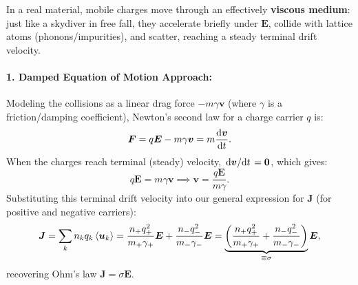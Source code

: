 \begin{center}
\end{center}

In a real material, mobile charges move through an effectively \textbf{viscous medium}: just like a skydiver in free fall, they accelerate briefly under $\bm{E}$, collide with lattice atoms (phonons/impurities), and scatter, reaching a steady terminal drift velocity.

\paragraph{1. Damped Equation of Motion Approach:}
Modeling the collisions as a linear drag force $-m\gamma \bm{v}$ (where $\gamma$ is a friction/damping coefficient), Newton's second law for a charge carrier $q$ is:
\begin{equation}
    \bm{F} = q\bm{E} - m\gamma \bm{v} = m\dv{\bm{v}}{t}.
\end{equation}
When the charges reach terminal (steady) velocity, $\dv*{\bm{v}}{t} = \bm{0}$, which gives:
\begin{equation}
    q\bm{E} = m\gamma \bm{v} \implies \bm{v} = \frac{q\bm{E}}{m\gamma}.
\end{equation}
Substituting this terminal drift velocity into our general expression for $\bm{J}$ (for positive and negative carriers):
\begin{equation}
    \bm{J} = \sum_k n_k q_k \ev{\bm{u}_k} = \frac{n_+ q_+^2}{m_+ \gamma_+} \bm{E} + \frac{n_- q_-^2}{m_- \gamma_-} \bm{E} = \underbrace{\left( \frac{n_+ q_+^2}{m_+ \gamma_+} + \frac{n_- q_-^2}{m_- \gamma_-} \right)}_{\equiv \sigma} \bm{E},
\end{equation}
recovering Ohm's law $\bm{J} = \sigma \bm{E}$.

